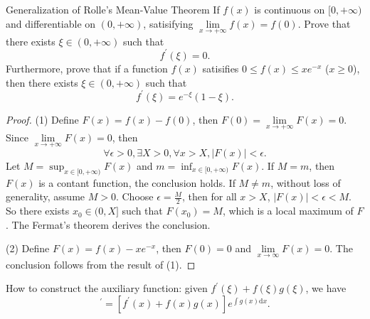 \begin{example}{Generalization of Rolle's Mean-Value Theorem}{}
  If $f(x)$ is continuous on $[0, +\infty)$ and differentiable on $(0,
  +\infty)$, satisifying $\lim \limits _{x \rightarrow +\infty}f(x) = f(0)$.
  Prove that there exists $\xi \in (0, +\infty)$ such that
  \begin{equation}
    f^{\prime}(\xi) = 0.
  \end{equation}
  Furthermore, prove that if a function $f(x)$ satisifies $0 \leq f(x) \leq
  xe^{-x}$ ($x \geq 0$), then there exists $\xi \in (0, +\infty)$ such that
  \begin{equation}
    f^{\prime}(\xi) = e^{-\xi} (1 - \xi).
  \end{equation}
\end{example}

\begin{proof}
  (1) Define $F(x) = f(x) - f(0)$, then $F(0) = \lim \limits _{x \rightarrow
    +\infty}F(x) = 0$.
  Since $\lim \limits _{x \rightarrow +\infty}F(x) = 0$, then
  \begin{equation}
    \forall \epsilon > 0, \exists X > 0, \forall x > X, |F(x)| < \epsilon.
  \end{equation}
  Let $M = \sup_{x \in [0, +\infty)}F(x)$ and $m = \inf _{x \in [0, +\infty)} F(x)$.
  If $M = m$, then $F(x)$ is a contant function, the conclusion holds.
  If $M \neq m$, without loss of generality, assume $M > 0$.
  Choose $\epsilon = \frac{M}{2}$, then for all $x > X$, $|F(x)| < \epsilon < M$.
  So there exists $x_0 \in (0, X]$ such that $F(x_0) = M$,
  which is a local maximum of $F$. The Fermat's theorem derives the conclusion.

  (2) Define $F(x) = f(x) - xe^{-x}$, then $F(0) = 0$ and $\lim \limits _{x
    \rightarrow \infty}F(x) = 0$. The conclusion follows from the result of (1).
\end{proof}

\begin{note}
  How to construct the auxiliary function:
  given $f^{\prime}(\xi) + f(\xi)g(\xi)$, we have
  \begin{equation}
    [f(x) e^{\int g(x)\mathrm{d} x}]^{\prime} = [f^{\prime}(x) + f(x)g(x)] e^{\int g(x)\mathrm{d} x}.
  \end{equation}
\end{note}

